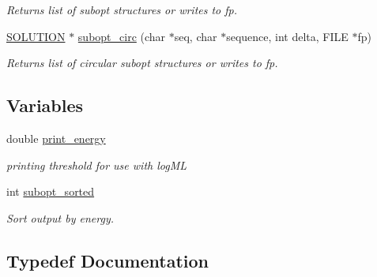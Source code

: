 \begin{DoxyCompactItemize}
\begin{DoxyCompactList}\small\item\em Returns list of subopt structures or writes to fp. \end{DoxyCompactList}\item 
\hyperlink{subopt_8h_aa0f46ff02e1017469cf902d02ecd7f9a}{S\+O\+L\+U\+T\+I\+ON} $\ast$ \hyperlink{group__subopt__wuchty_ga8634516e4740e0b6c9a46d2bae940340}{subopt\+\_\+circ} (char $\ast$seq, char $\ast$sequence, int delta, F\+I\+LE $\ast$fp)
\begin{DoxyCompactList}\small\item\em Returns list of circular subopt structures or writes to fp. \end{DoxyCompactList}\end{DoxyCompactItemize}
\subsection*{Variables}
\begin{DoxyCompactItemize}
\item 
\mbox{\label{group__subopt__wuchty_ga5e57d914bcb5feeecdf520e25313fcfe}} 
double \hyperlink{group__subopt__wuchty_ga5e57d914bcb5feeecdf520e25313fcfe}{print\+\_\+energy}
\begin{DoxyCompactList}\small\item\em printing threshold for use with log\+ML \end{DoxyCompactList}\item 
\mbox{\label{group__subopt__wuchty_ga873cf8ed69e0437f8efa8b1fec854a0e}} 
int \hyperlink{group__subopt__wuchty_ga873cf8ed69e0437f8efa8b1fec854a0e}{subopt\+\_\+sorted}
\begin{DoxyCompactList}\small\item\em Sort output by energy. \end{DoxyCompactList}\end{DoxyCompactItemize}


\subsection{Typedef Documentation}
\mbox{\label{group__subopt__wuchty_gaa0270c66d04f59e750401695b8282e04}} 
